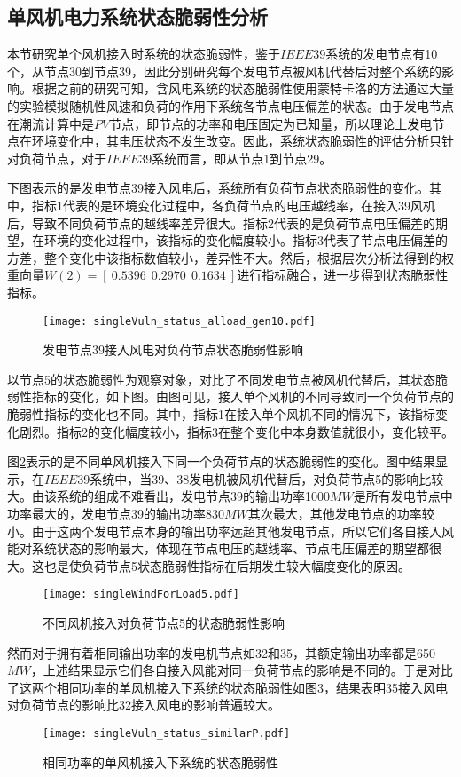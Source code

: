 \subsection{单风机电力系统状态脆弱性分析}
\label{sec:singleAnalysis_status}
本节研究单个风机接入时系统的状态脆弱性，鉴于$IEEE39$系统的发电节点有10个，从节点30到节点39，因此分别研究每个发电节点被风机代替后对整个系统的影响。根据之前的研究可知，含风电系统的状态脆弱性使用蒙特卡洛的方法通过大量的实验模拟随机性风速和负荷的作用下系统各节点电压偏差的状态。由于发电节点在潮流计算中是$PV$节点，即节点的功率和电压固定为已知量，所以理论上发电节点在环境变化中，其电压状态不发生改变。因此，系统状态脆弱性的评估分析只针对负荷节点，对于$IEEE39$系统而言，即从节点1到节点29。

下图表示的是发电节点39接入风电后，系统所有负荷节点状态脆弱性的变化。其中，指标1代表的是环境变化过程中，各负荷节点的电压越线率，在接入39风机后，导致不同负荷节点的越线率差异很大。指标2代表的是负荷节点电压偏差的期望，在环境的变化过程中，该指标的变化幅度较小。指标3代表了节点电压偏差的方差，整个变化中该指标数值较小，差异性不大。然后，根据层次分析法得到的权重向量$W(2)=\left[~0.5396~~0.2970~~0.1634~\right]$进行指标融合，进一步得到状态脆弱性指标。
\begin{figure}[H] %
  \centering
  \texttt{[image: singleVuln\_status\_alload\_gen10.pdf]}
  \caption{发电节点39接入风电对负荷节点状态脆弱性影响}
  \label{fig:singleVulnLoadGen10}
\end{figure}

以节点5的状态脆弱性为观察对象，对比了不同发电节点被风机代替后，其状态脆弱性指标的变化，如下图。由图可见，接入单个风机的不同导致同一个负荷节点的脆弱性指标的变化也不同。其中，指标1在接入单个风机不同的情况下，该指标变化剧烈。指标2的变化幅度较小，指标3在整个变化中本身数值就很小，变化较平。

图\ref{fig:singleWindForLoad5}表示的是不同单风机接入下同一个负荷节点的状态脆弱性的变化。图中结果显示，在$IEEE39$系统中，当39、38发电机被风机代替后，对负荷节点5的影响比较大。由该系统的组成不难看出，发电节点39的输出功率1000$MW$是所有发电节点中功率最大的，发电节点39的输出功率830$MW$其次最大，其他发电节点的功率较小。由于这两个发电节点本身的输出功率远超其他发电节点，所以它们各自接入风能对系统状态的影响最大，体现在节点电压的越线率、节点电压偏差的期望都很大。这也是使负荷节点5状态脆弱性指标在后期发生较大幅度变化的原因。
\begin{figure}[H] %
  \centering
  \texttt{[image: singleWindForLoad5.pdf]}
  \caption{不同风机接入对负荷节点5的状态脆弱性影响}
  \label{fig:singleWindForLoad5}
\end{figure}
然而对于拥有着相同输出功率的发电机节点如32和35，其额定输出功率都是650$MW$，上述结果显示它们各自接入风能对同一负荷节点的影响是不同的。于是对比了这两个相同功率的单风机接入下系统的状态脆弱性如图\ref{fig:singleVuln_status_similarP}，结果表明35接入风电对负荷节点的影响比32接入风电的影响普遍较大。
\begin{figure}[H] %
  \centering
  \texttt{[image: singleVuln\_status\_similarP.pdf]}
  \caption{相同功率的单风机接入下系统的状态脆弱性}
  \label{fig:singleVuln_status_similarP}
\end{figure}

